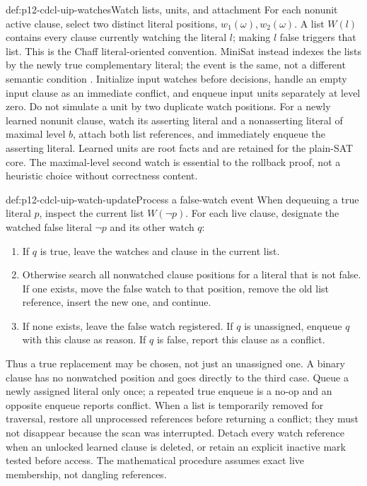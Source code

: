 \begin{hbdefinition}{def:p12-cdcl-uip-watches}{Watch lists, units, and attachment}
For each nonunit active clause, select two distinct literal positions,
\(w_1(\omega),w_2(\omega)\).  A list \(W(l)\) contains every clause
currently watching the literal \(l\); making \(l\) false triggers that
list.  This is the Chaff literal-oriented convention.  MiniSat instead indexes
the lists by the newly true complementary literal; the event is the same,
not a different semantic condition
\cite[Sec.~2]{MoskewiczEtAl2001ChaffV56}
\cite[Figs.~7--9]{EenSorenssonMiniSatExtended12}.
Initialize input watches before decisions, handle an empty input clause as
an immediate conflict, and enqueue input units separately at level zero.
Do not simulate a unit by two duplicate watch positions.  For a newly learned
nonunit clause, watch its asserting literal and a nonasserting literal of
maximal level \(b\), attach both list references, and immediately enqueue
the asserting literal.  Learned units are root facts and are retained for the
plain-SAT core.  The maximal-level second watch is essential to the rollback
proof, not a heuristic choice without correctness content.
\end{hbdefinition}

\begin{hbmethod}{def:p12-cdcl-uip-watch-update}{Process a false-watch event}
When dequeuing a true literal \(p\), inspect the current list
\(W(\neg p)\).  For each live clause, designate the watched false literal
\(\neg p\) and its other watch \(q\):
\begin{enumerate}
 \item If \(q\) is true, leave the watches and clause in the current list.
 \item Otherwise search all nonwatched clause positions for a literal that
       is not false.  If one exists, move the false watch to that position,
       remove the old list reference, insert the new one, and continue.
 \item If none exists, leave the false watch registered.  If \(q\) is
       unassigned, enqueue \(q\) with this clause as reason.  If \(q\)
       is false, report this clause as a conflict.
\end{enumerate}
Thus a true replacement may be chosen, not just an unassigned one.  A binary
clause has no nonwatched position and goes directly to the third case.
Queue a newly assigned literal only once; a repeated true enqueue is a no-op
and an opposite enqueue reports conflict.  When a list is temporarily removed
for traversal, restore all unprocessed references before returning a conflict;
they must not disappear because the scan was interrupted.  Detach every watch
reference when an unlocked learned clause is deleted, or retain an explicit
inactive mark tested before access.  The mathematical procedure assumes exact
live membership, not dangling references.
\end{hbmethod}

